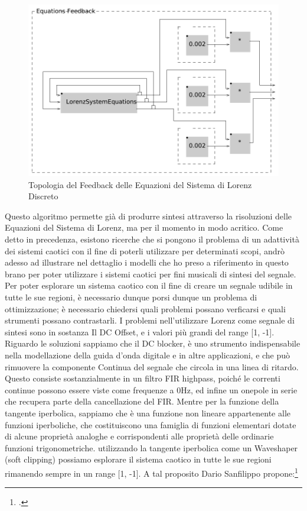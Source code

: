 \begin{figure}[h!]
\begin{center}
    \includegraphics[width=14cm]{figures/LorenzSystemFB1.pdf}
    \caption{Topologia del Feedback delle Equazioni del Sistema di Lorenz Discreto}
\end{center}
\vspace{0.5cm}
\end{figure}

Questo algoritmo permette già di produrre sintesi attraverso la 
risoluzioni delle Equazioni del Sistema di Lorenz, ma per il momento in modo acritico.
Come detto in precedenza, esistono ricerche che si pongono il problema 
di un adattività dei sistemi caotici con il fine di poterli utilizzare per determinati scopi,
andrò adesso ad illustrare nel dettaglio i modelli che ho preso 
a riferimento in questo brano per poter utilizzare
i sistemi caotici per fini musicali di sintesi del segnale. \\
Per poter esplorare un sistema caotico con il fine di creare un segnale udibile in tutte le sue regioni, 
è necessario dunque porsi dunque un problema di ottimizzazione;
è necessario chiedersi quali problemi possano verficarsi e quali strumenti possano contrastarli. 
I problemi nell'utilizzare Lorenz come segnale di sintesi 
sono in sostanza Il DC Offset, e i valori più grandi del range [1, -1].
Riguardo le soluzioni sappiamo che il DC blocker, 
è uno strumento indispensabile nella modellazione della guida d’onda
digitale e in altre applicazioni, e che può rimuovere la componente Continua del segnale 
che circola in una linea di ritardo. Questo consiste sostanzialmente in
un filtro FIR highpass, poiché le correnti continue possono essere viste come frequenze a
0Hz, ed infine un onepole in serie che recupera parte della cancellazione del FIR.
Mentre per la funzione della tangente iperbolica, sappiamo che è una funzione
non lineare appartenente alle funzioni iperboliche, che costituiscono una famiglia di funzioni 
elementari dotate di alcune proprietà analoghe e corrispondenti alle
proprietà delle ordinarie funzioni trigonometriche.
utilizzando la tangente iperbolica come un Waveshaper (soft clipping) possiamo 
esplorare il sistema caotico in tutte le sue regioni rimanendo sempre in un range [1, -1].
A tal proposito Dario Sanfilippo propone:\footcite{sanfilippo_constrained_2021}

